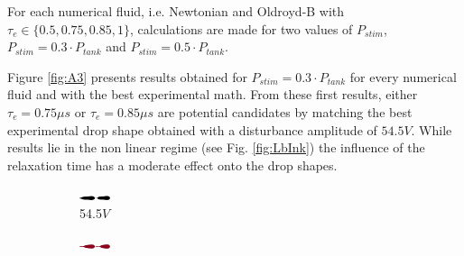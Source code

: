 \documentclass[onecolumn, 12pt]{asme2ej}
\begin{document}
For each numerical fluid, i.e. Newtonian and Oldroyd-B with $\tau_e \in  \{0.5,0.75,0.85,1\}$, calculations are made for two values of $P_{stim}$, $P_{stim}= 0.3\cdot P_{tank}$ and $P_{stim}= 0.5\cdot P_{tank}$. 

Figure \ref{fig:A3} presents results obtained for $P_{stim}=0.3\cdot P_{tank}$ for every numerical fluid and with the best experimental math. From these first results, either $\tau_e = 0.75 \mu s$  or $\tau_e = 0.85 \mu s$ are potential candidates by matching the best experimental drop shape obtained with a  disturbance amplitude of $54.5V$. While results lie in the non linear regime (see Fig. \ref{fig:LbInk}) the influence of the relaxation time has a moderate effect onto the drop shapes.

\begin{figure}[]

    \begin{subfigure}[t]{1.6cm}
        \centering
        \includegraphics[angle=-90,origin=c,width=0.9cm]{Figures/Fig15a.eps}        
        \caption{54.5$V$}
    \end{subfigure}
    \hfill
    \begin{subfigure}[t]{1.7cm}
        \centering
        \includegraphics[angle=-90,origin=c,width=0.9cm]{Figures/Fig15b.eps}


\end{subfigure}
\end{figure}
\end{document}

